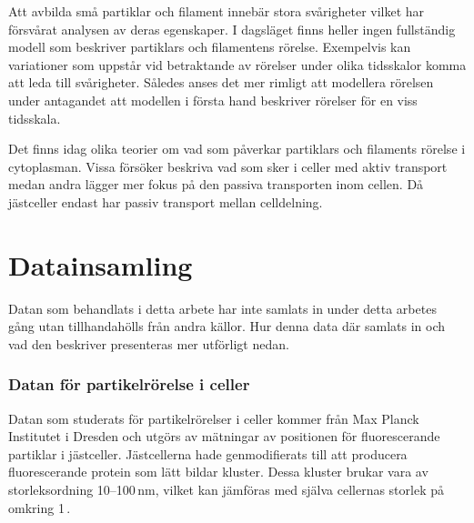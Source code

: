 Att avbilda små partiklar och filament innebär stora svårigheter vilket har försvårat analysen av deras egenskaper. I dagsläget finns heller ingen fullständig modell som beskriver partiklars och filamentens rörelse. %
Exempelvis kan variationer som uppstår vid betraktande av rörelser under olika tidsskalor komma att leda till svårigheter.%
Således anses det mer rimligt att modellera rörelsen under antagandet att modellen i första hand beskriver rörelser för en viss tidsskala.%

Det finns idag olika teorier om vad som påverkar partiklars och filaments rörelse i cytoplasman. Vissa försöker beskriva vad som sker i celler med aktiv transport medan andra lägger mer fokus på den passiva transporten inom cellen. Då jästceller endast har passiv transport mellan celldelning.%



\section{Datainsamling}
Datan som behandlats i detta arbete har inte samlats in under detta arbetes gång utan tillhandahölls från andra källor. Hur denna data där samlats in och vad den beskriver presenteras mer utförligt nedan.

\subsubsection{Datan för partikelrörelse i celler}
Datan som studerats för partikelrörelser i celler kommer från Max Planck Institutet i Dresden och utgörs av mätningar av positionen för fluorescerande partiklar i jästceller. Jästcellerna hade genmodifierats till att producera fluorescerande protein som lätt bildar kluster. 
Dessa kluster brukar vara av storleksordning 10--100\,nm, vilket kan jämföras med själva cellernas storlek på omkring 1\,.

